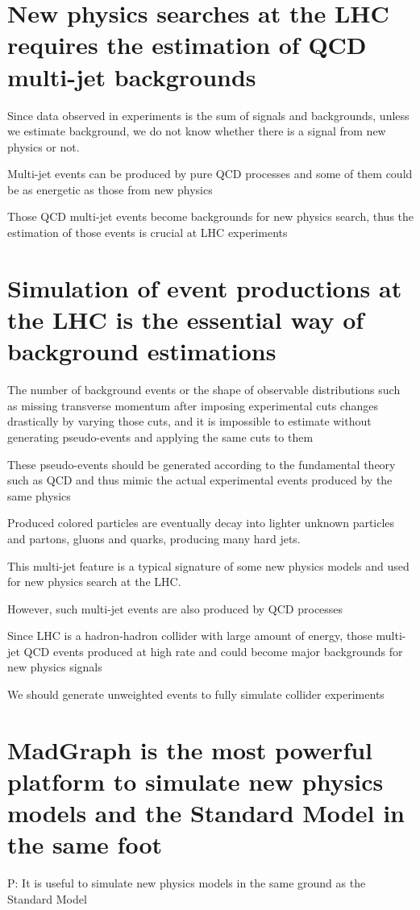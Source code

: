 \documentclass{book}
\begin{document}
\section{New physics searches at the LHC requires the estimation of QCD multi-jet backgrounds}
Since data observed in experiments is the sum of signals and backgrounds, unless we estimate background, we do not know whether there is a signal from new physics or not.

Multi-jet events can be produced by pure QCD processes and some of them could be as energetic as those from new physics

Those QCD multi-jet events become backgrounds for new physics search, thus the estimation of those events is crucial at LHC experiments

\section{Simulation of event productions at the LHC is the essential way of background estimations}
The number of background events or the shape of observable distributions such as missing transverse momentum after imposing experimental cuts changes drastically by varying those cuts, and it is  impossible to estimate without generating pseudo-events and applying the same cuts to them

These pseudo-events should be generated according to the fundamental theory such as QCD and thus mimic the actual experimental events produced by the same physics

Produced colored particles are eventually decay into lighter unknown particles and partons, gluons and quarks, producing many hard jets.

This multi-jet feature is a typical signature of some new physics models and used for new physics search at the LHC.

However, such multi-jet events are also produced by QCD processes

Since LHC is a hadron-hadron collider with large amount of energy, those multi-jet QCD events produced at high rate and could become major backgrounds for new physics signals



We should generate unweighted events to fully simulate collider experiments

\section{MadGraph is the most powerful platform to simulate new physics models and the Standard Model in the same foot}
P: It is useful to simulate new physics models in the same ground as the Standard Model
\end{document}
